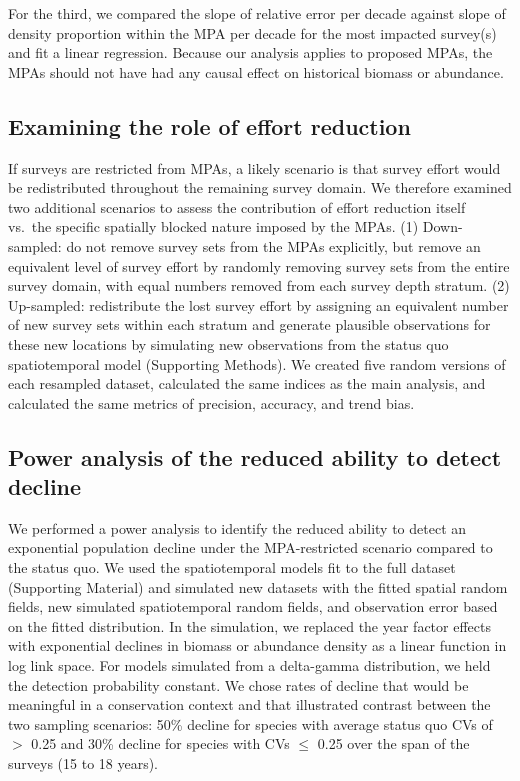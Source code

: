 \documentclass[12pt]{article}
\newcommand{\R}[1]{\label{#1}\linelabel{#1}}
\begin{document}
\begin{spacing}{1.4}
For the third, we compared the slope of relative error per decade against slope of density proportion within the MPA per decade for the most impacted survey(s) and fit a linear regression.
Because our analysis applies to proposed MPAs, the MPAs should not have had any causal effect on historical biomass or abundance.

\subsection*{Examining the role of effort reduction}

If surveys are restricted from MPAs, a likely scenario is that survey effort would be redistributed throughout the remaining survey domain.
We therefore examined two additional scenarios to assess the contribution of effort reduction itself vs.\ the specific spatially blocked nature imposed by the MPAs.
(1) Down-sampled: do not remove survey sets from the MPAs explicitly, but remove an equivalent level of survey effort by randomly removing survey sets from the entire survey domain, with equal numbers removed from each survey depth stratum.
(2) Up-sampled: redistribute the lost survey effort by assigning an equivalent number of new survey sets within each stratum and generate plausible observations for these new locations by simulating new observations from the status quo spatiotemporal model (Supporting Methods).
We created five random versions of each resampled dataset, calculated the same indices as the main analysis, and calculated the same metrics of precision, accuracy, and trend bias.


\subsection*{Power analysis of the reduced ability to detect decline}

We performed a power analysis to identify the reduced ability to detect an exponential population decline under the MPA-restricted scenario compared to the status quo.
We used the spatiotemporal models fit to the full dataset (Supporting Material) and simulated new datasets with the fitted spatial random fields, new simulated spatiotemporal random fields, and observation error based on the fitted distribution.
In the simulation, we replaced the year factor effects with exponential declines in biomass or abundance density as a linear function in log link space.
For models simulated from a delta-gamma distribution, we held the detection probability constant.
We chose rates of decline that would be meaningful \R{A4}in a conservation context and that illustrated contrast between the two sampling scenarios: 50\% decline for species with average status quo CVs of $>$ 0.25 and 30\% decline for species with CVs $\le$ 0.25 over the span of the surveys (15 to 18 years).


\end{spacing}
\end{document}
